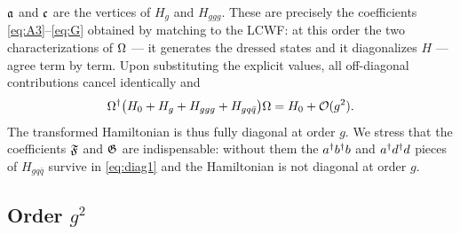 $\mathfrak{a}$ and $\mathfrak{c}$ are the vertices of $H_{g}$ and $H_{ggg}$. These are precisely the coefficients
\eqref{eq:A3}--\eqref{eq:G} obtained by matching to the LCWF: at this order the two characterizations of
$\Omega$ --- it generates the dressed states and it diagonalizes $H$ --- agree term by term. Upon
substituting the explicit values, all off-diagonal contributions cancel identically and
\begin{equation}
\Omega^{\dagger}\big(H_{0}+H_{g}+H_{ggg}+H_{gq\bar q}\big)\Omega=H_{0}+\mathcal{O}(g^{2}) .
\label{eq:diag1res}
\end{equation}
The transformed Hamiltonian is thus fully diagonal at order $g$. We stress that the coefficients
$\mathfrak{F}$ and $\mathfrak{G}$ are indispensable: without them the $a^{\dagger}b^{\dagger}b$ and $a^{\dagger}d^{\dagger}d$ pieces of
$H_{gq\bar q}$ survive in \eqref{eq:diag1} and the Hamiltonian is not diagonal at order $g$.

\subsection{Order $g^{2}$}

